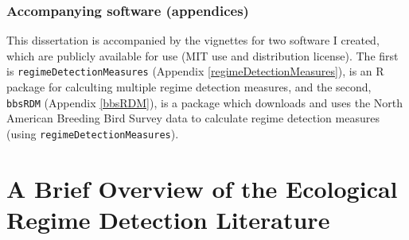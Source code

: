 \documentclass[12pt,twoside,openany]{reedthesis}
\begin{document}
\hypertarget{accompanying-software-appendices}{%
\subsection{Accompanying software (appendices)}\label{accompanying-software-appendices}}

This dissertation is accompanied by the vignettes for two software I created, which are publicly available for use (MIT use and distribution license). The first is \texttt{regimeDetectionMeasures} (Appendix \ref{regimeDetectionMeasures}), is an R package for calculting multiple regime detection measures, and the second, \texttt{bbsRDM} (Appendix \ref{bbsRDM}), is a package which downloads and uses the North American Breeding Bird Survey data to calculate regime detection measures (using \texttt{regimeDetectionMeasures}).

\hypertarget{rdmReview}{%
\chapter{A Brief Overview of the Ecological Regime Detection Literature}\label{rdmReview}}
\end{document}
